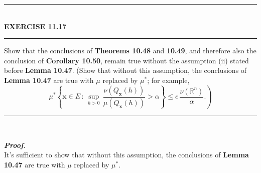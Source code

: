 \documentclass[a4paper,11pt]{article}
\begin{document}
	\begin{flushleft}
		\rule[-0.5ex]{17cm}{2pt}\\
			\textbf{EXERCISE 11.17}\\
		\rule[1.5ex]{17cm}{0.5pt}
			Show that the conclusions of \textbf{Theorems 10.48} and \textbf{10.49}, and therefore also the conclusion of \textbf{Corollary 10.50}, remain true without the assumption (ii)	stated before \textbf{Lemma 10.47}. (Show that without this assumption, the conclusions of \textbf{Lemma 10.47} are true with $\mu$ replaced by $\mu^*$; for example,
				$$\left. \mu^*\left\{ \mathbf{x} \in E\,:\, \underset{h > 0}{\sup}\,\frac{\nu(Q_{\mathbf{x}}(h))}{\mu(Q_{\mathbf{x}}(h))} > \alpha \right\} \leq c\,\frac{\nu(\mathbb{R}^n)}{\alpha} .\right)$$
		\rule[1.0ex]{17cm}{0.5pt}\
	\end{flushleft}
	\textbf{\textit{Proof.}}\\
	It's sufficient to show that without this assumption, the conclusions of \textbf{Lemma 10.47} are true with $\mu$ replaced by $\mu^*$.
\end{document}
